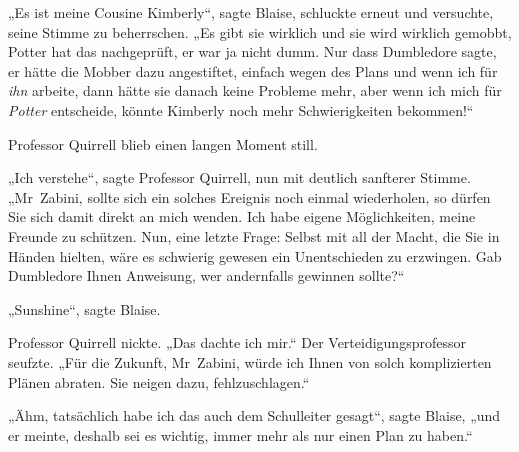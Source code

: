 „Es ist meine Cousine Kimberly“, sagte Blaise, schluckte erneut und versuchte, seine Stimme zu beherrschen. „Es gibt sie wirklich und sie wird wirklich gemobbt, Potter hat das nachgeprüft, er war ja nicht dumm. Nur dass Dumbledore sagte, er hätte die Mobber dazu angestiftet, einfach wegen des Plans und wenn ich für \emph{ihn} arbeite, dann hätte sie danach keine Probleme mehr, aber wenn ich mich für \emph{Potter} entscheide, könnte Kimberly noch mehr Schwierigkeiten bekommen!“

Professor Quirrell blieb einen langen Moment still.

„Ich verstehe“, sagte Professor Quirrell, nun mit deutlich sanfterer Stimme. „Mr~Zabini, sollte sich ein solches Ereignis noch einmal wiederholen, so dürfen Sie sich damit direkt an mich wenden. Ich habe eigene Möglichkeiten, meine Freunde zu schützen. Nun, eine letzte Frage: Selbst mit all der Macht, die Sie in Händen hielten, wäre es schwierig gewesen ein Unentschieden zu erzwingen. Gab Dumbledore Ihnen Anweisung, wer andernfalls gewinnen sollte?“

„Sunshine“, sagte Blaise.

Professor Quirrell nickte. „Das dachte ich mir.“ Der Verteidigungsprofessor seufzte. „Für die Zukunft, Mr~Zabini, würde ich Ihnen von solch komplizierten Plänen abraten. Sie neigen dazu, fehlzuschlagen.“

„Ähm, tatsächlich habe ich das auch dem Schulleiter gesagt“, sagte Blaise, „und er meinte, deshalb sei es wichtig, immer mehr als nur einen Plan zu haben.“


